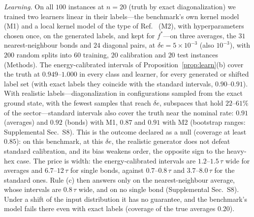 \documentclass[aps,prx,twocolumn,10pt,superscriptaddress,nofootinbib,longbibliography,floatfix]{revtex4-2}
\theoremstyle{remark}
\newcommand{\de}{\delta e}
\begin{document}
\emph{Learning.} On all $100$ instances at $n=20$ (truth by exact diagonalization) we trained two learners linear in %
their labels---the benchmark's own kernel model (M1) and a local kernel model of the type of Ref.~\cite{lewis2024}
(M2), with hyperparameters chosen once, on the generated labels, and kept for $f^*$---on three averages, the $31$ %
nearest-neighbour bonds and $24$ diagonal pairs, at $\de=5\times10^{-3}$ (also %
$10^{-3}$), with $200$ random splits into $60$ training, $20$ calibration and $20$ test instances (Methods). The %
energy-calibrated intervals of Proposition~\ref{prop:learn}(b) cover the truth at $0.949$--$1.000$ in every class %
and learner, for every generated or shifted label set (with exact labels they coincide with the standard
intervals, $0.90$--$0.91$). %
With realistic labels---diagonalization in configurations sampled from the exact ground state, with the
fewest samples that reach $\de$, subspaces that hold $22$--$61\%$ of the sector---standard intervals also cover the truth near the nominal rate: $0.91$ (averages) and $0.92$ (bonds) %
with M1, $0.87$ and $0.91$ with M2 (bootstrap ranges: Supplemental Sec.~S8). This is the outcome declared as a null %
(coverage at least $0.85$): on this benchmark, at this $\de$, the realistic generator does %
not defeat standard calibration, and its bias weakens order, the opposite sign to the heavy-hex case. The price is
width: the energy-calibrated intervals are $1.2$--$1.5\,\tau$ wide for averages and $6.7$--$12\,\tau$ for %
single bonds, against $0.7$--$0.8\,\tau$ and $3.7$--$8.0\,\tau$ for the standard ones. Rule (c) then answers only on the nearest-neighbour average, whose intervals are $0.8\,\tau$ wide, and on no %
single bond (Supplemental Sec.~S8). Under a shift of the input distribution it has no guarantee, and the benchmark's
model fails there even with exact labels (coverage of the true averages $0.20$). %
\end{document}
